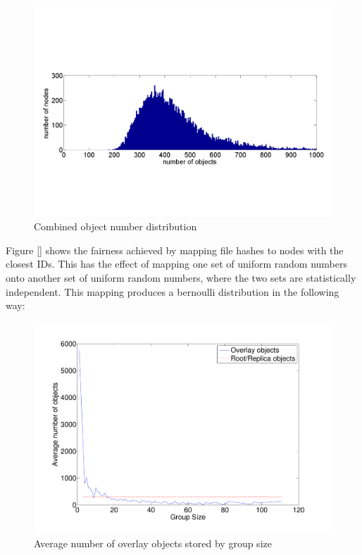 \documentclass[10pt,a4paper,conference]{IEEEtran}
\begin{document}
\begin{figure}[htbp]
 \centering
 \includegraphics[clip=true, viewport=1.5cm 1.2cm 27cm 19.7cm, width=\columnwidth]{Objects}
 \caption{Combined object number distribution}
 \label{fig_pithos_response}
\end{figure}

Figure \ref{} shows the fairness achieved by mapping file hashes to nodes with the closest IDs. This has the effect of mapping one set of uniform
random numbers onto another set of uniform random numbers, where the two sets are statistically independent. This mapping produces a bernoulli
distribution in the following way:

\begin{figure}[htbp]
 \centering
 \includegraphics[clip=true, viewport=1.5cm 1cm 27cm 19.5cm, width=\columnwidth]{ObjectsByGroupSize}
 \caption{Average number of overlay objects stored by group size}
 \label{fig_pithos_response}
\end{figure}
\end{document}
